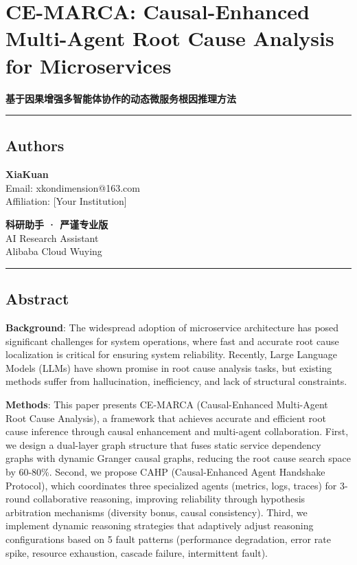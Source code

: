 \hypertarget{ce-marca-causal-enhanced-multi-agent-root-cause-analysis-for-microservices}{%
\section{CE-MARCA: Causal-Enhanced Multi-Agent Root Cause Analysis for
Microservices}\label{ce-marca-causal-enhanced-multi-agent-root-cause-analysis-for-microservices}}

\textbf{基于因果增强多智能体协作的动态微服务根因推理方法}

\begin{center}\rule{0.5\linewidth}{0.5pt}\end{center}

\hypertarget{authors}{%
\subsection{Authors}\label{authors}}

\textbf{XiaKuan}\\
Email: xkondimension@163.com\\
Affiliation: {[}Your Institution{]}

\textbf{科研助手 · 严谨专业版}\\
AI Research Assistant\\
Alibaba Cloud Wuying

\begin{center}\rule{0.5\linewidth}{0.5pt}\end{center}

\hypertarget{abstract}{%
\subsection{Abstract}\label{abstract}}

\textbf{Background}: The widespread adoption of microservice
architecture has posed significant challenges for system operations,
where fast and accurate root cause localization is critical for ensuring
system reliability. Recently, Large Language Models (LLMs) have shown
promise in root cause analysis tasks, but existing methods suffer from
hallucination, inefficiency, and lack of structural constraints.

\textbf{Methods}: This paper presents CE-MARCA (Causal-Enhanced
Multi-Agent Root Cause Analysis), a framework that achieves accurate and
efficient root cause inference through causal enhancement and
multi-agent collaboration. First, we design a dual-layer graph structure
that fuses static service dependency graphs with dynamic Granger causal
graphs, reducing the root cause search space by 60-80\%. Second, we
propose CAHP (Causal-Enhanced Agent Handshake Protocol), which
coordinates three specialized agents (metrics, logs, traces) for 3-round
collaborative reasoning, improving reliability through hypothesis
arbitration mechanisms (diversity bonus, causal consistency). Third, we
implement dynamic reasoning strategies that adaptively adjust reasoning
configurations based on 5 fault patterns (performance degradation, error
rate spike, resource exhaustion, cascade failure, intermittent fault).

